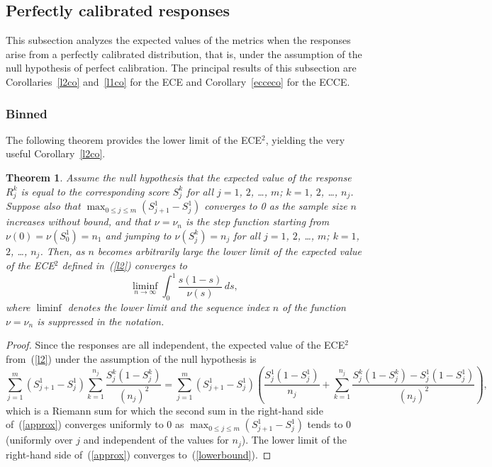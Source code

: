 \documentclass{article}
\newtheorem{theorem}{Theorem}[]
\begin{document}
\subsection{Perfectly calibrated responses}
\label{perfectsub}

This subsection analyzes the expected values of the metrics when the responses
arise from a perfectly calibrated distribution, that is,
under the assumption of the null hypothesis of perfect calibration.
The principal results of this subsection
are Corollaries~\ref{l2co} and~\ref{l1co} for the ECE
and Corollary~\ref{ecceco} for the ECCE.

\subsubsection{Binned}

The following theorem provides the lower limit of the ECE$^2$,
yielding the very useful Corollary~\ref{l2co}.

\begin{theorem}
\label{perfectly}
Assume the null hypothesis that the expected value of the response $R_j^k$ is
equal to the corresponding score $S_j^k$ for all $j = 1$, $2$, \dots, $m$;
$k = 1$, $2$, \dots, $n_j$.
Suppose also that $\max_{0 \le j \le m} (S_{j+1}^1 - S_j^1)$ converges to 0
as the sample size $n$ increases without bound,
and that $\nu = \nu_n$ is the step function
starting from $\nu(0) = \nu(S_0^1) = n_1$ and jumping to $\nu(S_j^k) = n_j$
for all $j = 1$, $2$, \dots, $m$; $k = 1$, $2$, \dots, $n_j$.
Then, as $n$ becomes arbitrarily large
the lower limit of the expected value of the ECE$^2$ defined in~(\ref{l2})
converges to
%
\begin{equation}
\label{lowerbound}
\liminf_{n \to \infty} \int_0^1 \frac{s (1 - s)}{\nu(s)} \, ds,
\end{equation}
%
where $\liminf$ denotes the lower limit and the sequence index $n$
of the function $\nu = \nu_n$ is suppressed in the notation.
\end{theorem}

\begin{proof}
Since the responses are all independent, the expected value of the ECE$^2$
from~(\ref{l2}) under the assumption of the null hypothesis is
%
\begin{equation}
\label{approx}
\sum_{j=1}^m \left( S_{j+1}^1 - S_j^1 \right)
\sum_{k=1}^{n_j} \frac{S_j^k \left( 1 - S_j^k \right)}{(n_j)^2}
= \sum_{j=1}^m \left( S_{j+1}^1 - S_j^1 \right)
\left( \frac{S_j^1 \left( 1 - S_j^1 \right)}{n_j}
+ \sum_{k=1}^{n_j}\frac{S_j^k \left( 1 - S_j^k \right)
                        - S_j^1 \left( 1 - S_j^1 \right)}{(n_j)^2} \right),
\end{equation}
%
which is a Riemann sum for which the second sum in the right-hand side
of~(\ref{approx}) converges uniformly to 0
as $\max_{0 \le j \le m} (S_{j+1}^1 - S_j^1)$ tends to 0
(uniformly over $j$ and independent of the values for $n_j$).
The lower limit of the right-hand side of~(\ref{approx})
converges to~(\ref{lowerbound}).
\end{proof}
\end{document}
